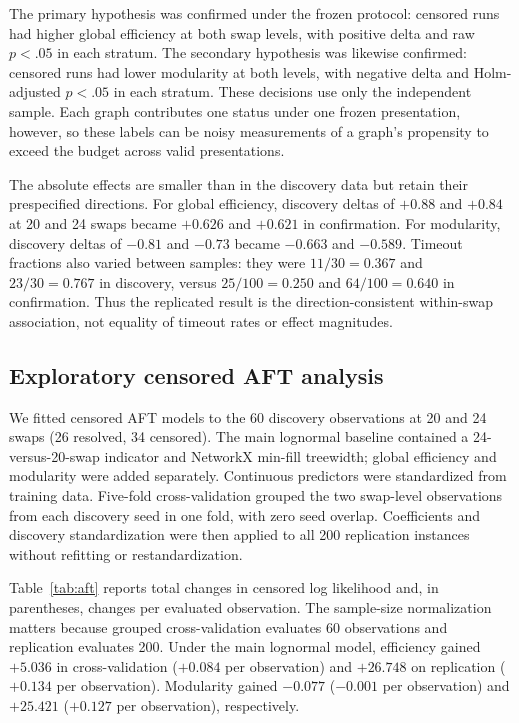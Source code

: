 \documentclass[11pt]{article}
\begin{document}
The primary hypothesis was confirmed under the frozen protocol: censored runs had higher global efficiency at both swap levels, with positive delta and raw $p<.05$ in each stratum. The secondary hypothesis was likewise confirmed: censored runs had lower modularity at both levels, with negative delta and Holm-adjusted $p<.05$ in each stratum. These decisions use only the independent sample. Each graph contributes one status under one frozen presentation, however, so these labels can be noisy measurements of a graph's propensity to exceed the budget across valid presentations.

The absolute effects are smaller than in the discovery data but retain their prespecified directions. For global efficiency, discovery deltas of $+0.88$ and $+0.84$ at 20 and 24 swaps became $+0.626$ and $+0.621$ in confirmation. For modularity, discovery deltas of $-0.81$ and $-0.73$ became $-0.663$ and $-0.589$. Timeout fractions also varied between samples: they were $11/30=0.367$ and $23/30=0.767$ in discovery, versus $25/100=0.250$ and $64/100=0.640$ in confirmation. Thus the replicated result is the direction-consistent within-swap association, not equality of timeout rates or effect magnitudes.

\subsection{Exploratory censored AFT analysis}
\label{sec:aft}

We fitted censored AFT models to the 60 discovery observations at 20 and 24 swaps (26 resolved, 34 censored). The main lognormal baseline contained a 24-versus-20-swap indicator and NetworkX min-fill treewidth; global efficiency and modularity were added separately. Continuous predictors were standardized from training data. Five-fold cross-validation grouped the two swap-level observations from each discovery seed in one fold, with zero seed overlap. Coefficients and discovery standardization were then applied to all 200 replication instances without refitting or restandardization.

Table~\ref{tab:aft} reports total changes in censored log likelihood and, in parentheses, changes per evaluated observation. The sample-size normalization matters because grouped cross-validation evaluates 60 observations and replication evaluates 200. Under the main lognormal model, efficiency gained $+5.036$ in cross-validation ($+0.084$ per observation) and $+26.748$ on replication ($+0.134$ per observation). Modularity gained $-0.077$ ($-0.001$ per observation) and $+25.421$ ($+0.127$ per observation), respectively.
\end{document}
